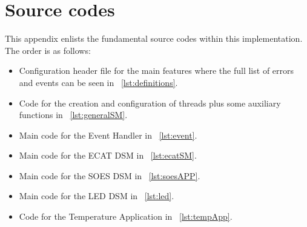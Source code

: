 \chapter{Source codes}\label{appx:code}
This appendix enlists the fundamental source codes within this implementation. The order is as follows:
\begin{itemize}
    \item Configuration header file for the main features where the full list of errors and events can be seen in ~\ref{lst:definitions}.
    \item Code for the creation and configuration of threads plus some auxiliary functions in ~\ref{lst:generalSM}.
    \item Main code for the Event Handler in ~\ref{lst:event}.
    \item Main code for the ECAT DSM in ~\ref{lst:ecatSM}.
    \item Main code for the SOES DSM in ~\ref{lst:soesAPP}. 
    \item Main code for the LED DSM in ~\ref{lst:led}.
    \item Code for the Temperature Application in ~\ref{lst:tempApp}.
\end{itemize}

